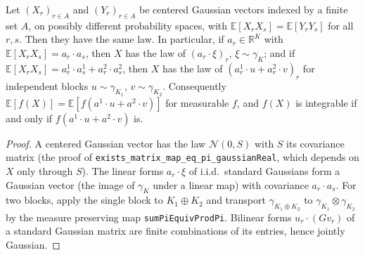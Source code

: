 \begin{lemma}\label{lem:sg:gram}
  \leanok
Let $(X_r)_{r\in A}$ and $(Y_r)_{r\in A}$ be centered Gaussian vectors indexed by a finite set $A$, on possibly different probability spaces,
with $\mathbb E[X_rX_s]=\mathbb E[Y_rY_s]$ for all $r,s$. Then they have the same law. In particular, if $a_r\in\mathbb R^{K}$ with
$\mathbb E[X_rX_s]=a_r\cdot a_s$, then $X$ has the law of $(a_r\cdot\xi)_r$, $\xi\sim\gamma_K$; and if
$\mathbb E[X_rX_s]=a^1_r\cdot a^1_s+a^2_r\cdot a^2_s$, then $X$ has the law of $(a^1_r\cdot u+a^2_r\cdot v)_r$ for independent blocks
$u\sim\gamma_{K_1}$, $v\sim\gamma_{K_2}$. Consequently $\mathbb E[f(X)]=\mathbb E[f(a^1\!\cdot u+a^2\!\cdot v)]$ for measurable $f$, and $f(X)$ is
integrable if and only if $f(a^1\!\cdot u+a^2\!\cdot v)$ is.
\end{lemma}

\begin{proof}
  \leanok
A centered Gaussian vector has the law $\mathcal N(0,S)$ with $S$ its covariance matrix (the proof of
\texttt{exists\_matrix\_map\_eq\_pi\_gaussianReal}, which depends on $X$ only through $S$). The linear forms $a_r\cdot\xi$ of i.i.d.\ standard
Gaussians form a Gaussian vector (the image of $\gamma_K$ under a linear map) with covariance $a_r\cdot a_s$. For two blocks, apply the single
block to $K_1\oplus K_2$ and transport $\gamma_{K_1\oplus K_2}$ to $\gamma_{K_1}\otimes\gamma_{K_2}$ by the measure preserving map
\texttt{sumPiEquivProdPi}. Bilinear forms $u_r\cdot(Gv_r)$ of a standard Gaussian matrix are finite combinations of its entries, hence jointly Gaussian.
\end{proof}

